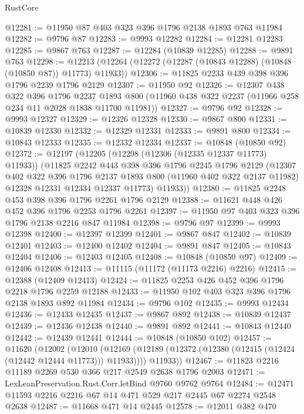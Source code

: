 \begin{lexlean}{RustCore}
\begin{coremodule}
@12281 := @11950 @87 @403 @323 @396 @1796 @2138 @1893 @763 @11984
@12282 := @9796 @87
@12283 := @9993 @12282
@12284 := @12281 @12283
@12285 := @9867 @763
@12287 := @12284 (@10839 @12285)
@12288 := @9891 @763
@12298 := @12213 (@12264 (@12272 (@12287 (@10843 @12288) (@10848 (@10850 @87)) @11773) @11933))
@12306 := @11825 @2233 @439 @398 @396 @1796 @2239 @1796 @2129
@12307 := @11950 @92
@12326 := @12307
    @438
    @322
    @396
    @1796
    @2237
    @1893
    @800
    (@11960 @438 @322 @2237 (@11966 @258 @234 @11 @2028 @1838 @11700 @11981))
@12327 := @9796 @92
@12328 := @9993 @12327
@12329 := @12326 @12328
@12330 := @9867 @800
@12331 := @10839 @12330
@12332 := @12329 @12331
@12333 := @9891 @800
@12334 := @10843 @12333
@12335 := @12332 @12334
@12337 := @10848 (@10850 @92)
@12372 := @12197
    (@12205
      (@12298 (@12306 (@12335 @12337 @11773) @11933))
      (@11825
        @2242
        @443
        @398
        @396
        @1796
        @2245
        @1796
        @2129
        (@12307
          @402
          @322
          @396
          @1796
          @2137
          @1893
          @800
          (@11960 @402 @322 @2137 @11982)
          @12328
          @12331
          @12334
          @12337
          @11773)
        @11933))
@12380 := @11825 @2248 @453 @398 @396 @1796 @2261 @1796 @2129
@12388 := @11621 @448 @426 @452 @396 @1796 @2253 @1796 @2261
@12397 := @11950 @97 @403 @323 @396 @1796 @2138 @2216 @847 @11984
@12398 := @9796 @97
@12399 := @9993 @12398
@12400 := @12397 @12399
@12401 := @9867 @847
@12402 := @10839 @12401
@12403 := @12400 @12402
@12404 := @9891 @847
@12405 := @10843 @12404
@12406 := @12403 @12405
@12408 := @10848 (@10850 @97)
@12409 := @12406 @12408
@12413 := @11115 (@11172 (@11173 @2216) @2216)
@12415 := @12388 (@12409 @12413)
@12424 := @11825 @2253 @426 @452 @396 @1796 @2218 @1796 @2259 @12188
@12433 := @11950 @102 @403 @323 @396 @1796 @2138 @1893 @892 @11984
@12434 := @9796 @102
@12435 := @9993 @12434
@12436 := @12433 @12435
@12437 := @9867 @892
@12438 := @10839 @12437
@12439 := @12436 @12438
@12440 := @9891 @892
@12441 := @10843 @12440
@12442 := @12439 @12441
@12444 := @10848 (@10850 @102)
@12457 := @11620
    (@12002
      (@12010
        (@12169 (@12189 (@12372 (@12380 (@12415 (@12424 (@12442 @12444 @11773))) @11933))))
        @11933))
@12467 := @11823 @2216 @11189 @2269 @530 @366 @217 @2549 @2638 @1796 @2003
@12471 := LexLeanPreservation.Rust.Corr.letBind @9760 @9762 @9764
@12484 := @12471 @11593 @2216 @2216 @67 @14 @471 @529 @217 @2445 @67 @2274 @2548 @2638
@12487 := @11668 @471 @14 @2445
@12578 := @12011
    @382
    @470

\end{coremodule}
\end{lexlean}
